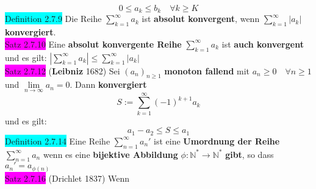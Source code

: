 \documentclass[landscape, 10pt]{article}
\newcommand{\N}{\mathbb{N}}
\begin{document}
\begin{multicols}{3}
\begin{equation*}
                            0\leqslant a_k\leqslant b_k\quad
                            \forall k\geqslant K
                     \end{equation*}
              \colorbox{cyan}{Definition 2.7.9} 
                     Die Reihe 
                     \textcolor{NavyBlue}{
                     $\sum_{k=1}^\infty a_k$} ist 
                     \textbf{absolut konvergent}, 
                     wenn \textcolor{NavyBlue}{
                     $\sum_{k=1}^\infty |a_k|$} 
                     \textbf{konvergiert}.\\
              \colorbox{magenta}{Satz 2.7.10} 
                     Eine \textbf{absolut konvergente Reihe} 
                     \textcolor{NavyBlue}{$\sum_{k=1}^\infty a_k$}
                     ist \textbf{auch konvergent} und es gilt:
                     \textcolor{NavyBlue}{
                     $|\sum_{k=1}^\infty a_k|
                     \leqslant\sum_{k=1}^\infty |a_k|$}\\
              \colorbox{magenta}{Satz 2.7.12} 
              (\textbf{Leibniz} 1682) 
                     Sei \textcolor{NavyBlue}{
                     $(a_n)_{n\geqslant1}$}
                     \textbf{monoton fallend} 
                     mit \textcolor{NavyBlue}{
                     $a_n\geqslant0\quad\forall n\geqslant1$} und 
                     \textcolor{NavyBlue}{
                     $\lim\limits_{n\to\infty}a_n=0$}. 
                     Dann \textbf{konvergiert} 
                     \begin{equation*}
                            S:=\sum_{k=1}^\infty (-1)^{k+1}a_k
                     \end{equation*}
                     und es gilt: 
                     \begin{equation*}
                            a_1-a_2\leqslant S\leqslant a_1
                     \end{equation*}
              \colorbox{cyan}{Definition 2.7.14} 
                     Eine Reihe \textcolor{NavyBlue}{$\sum_{n=1}^\infty a_n'$} 
                     ist eine 
                     \textbf{Umordnung der Reihe} 
                     \textcolor{NavyBlue}{$\sum_{n=1}^\infty a_n$} 
                     wenn es eine \textbf{bijektive Abbildung} 
                     \textcolor{NavyBlue}{$\phi :\N^*\longrightarrow\N^*$} 
                     \textbf{gibt}, so dass 
                     \textcolor{NavyBlue}{$a_n'=a_{\phi(n)}$}\\
              \colorbox{magenta}{Satz 2.7.16} 
              (Drichlet 1837) Wenn 

\end{multicols}
\end{document}

